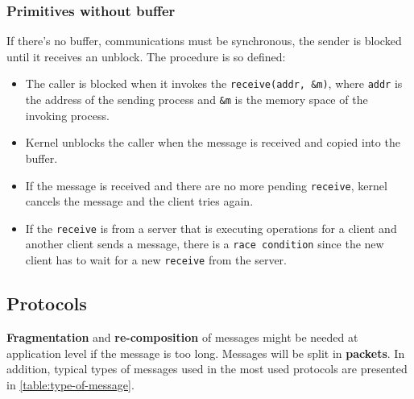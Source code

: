 \subsubsection{Primitives without buffer}
If there's no buffer, communications must be synchronous, the sender is blocked until it receives an unblock. The procedure is so defined:
\begin{itemize}
    \item The caller is blocked when it invokes the \verb!receive(addr, &m)!, where \verb!addr! is the address of the sending process and \verb!&m! is the memory space of the invoking process.
    \item Kernel unblocks the caller when the message is received and copied into the buffer.
    \item If the message is received and there are no more pending \verb!receive!, kernel cancels the message and the client tries again.
    \item If the \verb!receive! is from a server that is executing operations for a client and another client sends a message, there is a \verb!race condition! since the new client has to wait for a new \verb!receive! from the server.
\end{itemize}
   
\subsection{Protocols}
\textbf{Fragmentation} and \textbf{re-composition} of messages might be needed at application level if the message is too long. Messages will be split in \textbf{packets}.
In addition, typical types of messages used in the most used protocols are presented in \autoref{table:type-of-message}.

